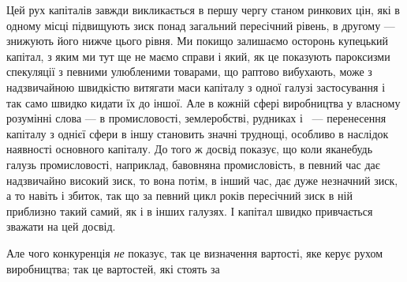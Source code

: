 Цей рух капіталів завжди викликається в першу чергу станом ринкових цін, які в одному місці
підвищують зиск понад загальний пересічний рівень, в другому — знижують його нижче цього рівня. Ми
покищо залишаємо осторонь купецький капітал, з яким ми тут ще не маємо справи і який, як це
показують пароксизми спекуляції з певними улюбленими товарами, що раптово вибухають, може з
надзвичайною швидкістю витягати маси капіталу з одної галузі застосування і так само швидко кидати
їх до іншої. Але в кожній сфері виробництва у власному розумінні слова — в промисловості,
землеробстві, рудниках і~ — перенесення капіталу з однієї сфери в іншу становить значні
труднощі, особливо в наслідок наявності основного капіталу. До того ж досвід показує, що коли
яканебудь галузь промисловості,
наприклад, бавовняна промисловість, в певний час дає надзвичайно високий зиск, то вона потім, в
інший час, дає дуже незначний зиск, а то навіть і збиток, так що за певний цикл років пересічний
зиск в ній приблизно такий самий, як і в інших галузях. І капітал швидко привчається зважати на цей
досвід.

Але чого конкуренція \emph{не} показує, так це визначення вартості, яке керує рухом виробництва; так це
вартостей, які стоять за
\parbreak{}  %
